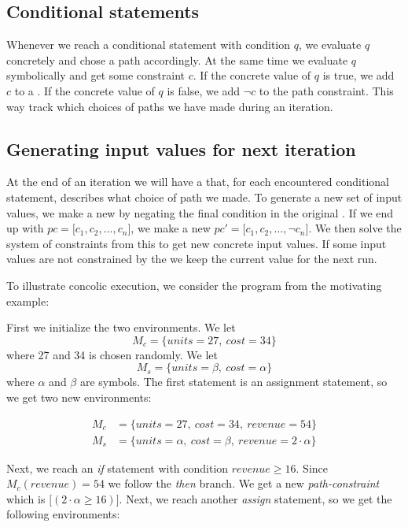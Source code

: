 	\subsection{Conditional statements}
	
	Whenever we reach a conditional statement with condition $q$, we evaluate $q$ concretely and chose a path accordingly. At the same time we evaluate $q$ symbolically and get some constraint $c$. If the concrete value of $q$ is true, we add $c$ to a \pc. If the concrete value of $q$ is false, we add $\neg c$ to the path constraint. This way track which choices of paths we have made during an iteration. 
	
	\subsection{Generating input values for next iteration}
	
	At the end of an iteration we will have a \pc that, for each encountered conditional statement, describes what choice of path we made. To generate a new set of input values, we make a new \pc by negating the final condition in the original \pc. If we end up with $pc = \lbrack c_1, c_2, \ldots, c_n \rbrack$, we make a new \pc $pc' = \lbrack c_1, c_2, \ldots, \neg c_n \rbrack$. We then solve the system of constraints from this \pc to get new concrete input values. If some input values are not constrained by the \pc we keep the current value for the next run.

\bigskip
To illustrate concolic execution, we consider the program from the motivating example:
\motexample
\newpage

\noindent First we initialize the two environments. We let 
\begin{equation*}
	M_c = \{units = 27, \ cost = 34\}
\end{equation*}
 where 27 and 34 is chosen randomly. We let
\begin{equation*}
 	M_s = \{units =\beta, \ cost = \alpha\}
\end{equation*}
where $\alpha$ and $\beta$ are symbols. The first statement is an assignment statement, so we get two new environments:

\begin{align*}
	M_c & = \{units = 27, \ cost = 34, \ revenue = 54 \}\\
	M_s & = \{units = \alpha, \ cost = \beta, \ revenue = 2\cdot \alpha \}
\end{align*}

Next, we reach an \textsl{if} statement with condition $revenue \geq 16$. Since $M_c(revenue) = 54$ we follow the \textsl{then} branch. We get a new \emph{path-constraint} which is $\lbrack (2\cdot \alpha \geq 16) \rbrack$. Next, we reach another \textsl{assign} statement, so we get the following environments:

